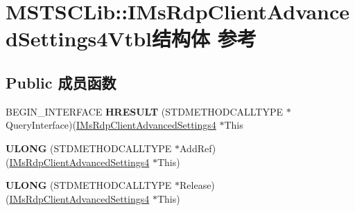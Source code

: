 \hypertarget{struct_m_s_t_s_c_lib_1_1_i_ms_rdp_client_advanced_settings4_vtbl}{}\section{M\+S\+T\+S\+C\+Lib\+:\+:I\+Ms\+Rdp\+Client\+Advanced\+Settings4\+Vtbl结构体 参考}
\label{struct_m_s_t_s_c_lib_1_1_i_ms_rdp_client_advanced_settings4_vtbl}
\subsection*{Public 成员函数}
\begin{DoxyCompactItemize}
\item 
\mbox{\label{struct_m_s_t_s_c_lib_1_1_i_ms_rdp_client_advanced_settings4_vtbl_a033a0ce0cc8e055d5d7dcf5f50311173}} 
B\+E\+G\+I\+N\+\_\+\+I\+N\+T\+E\+R\+F\+A\+CE {\bfseries H\+R\+E\+S\+U\+LT} (S\+T\+D\+M\+E\+T\+H\+O\+D\+C\+A\+L\+L\+T\+Y\+PE $\ast$Query\+Interface)(\hyperlink{interface_m_s_t_s_c_lib_1_1_i_ms_rdp_client_advanced_settings4}{I\+Ms\+Rdp\+Client\+Advanced\+Settings4} $\ast$This
\item 
\mbox{\label{struct_m_s_t_s_c_lib_1_1_i_ms_rdp_client_advanced_settings4_vtbl_ae203ed3925c552281dba85b80f01c192}} 
{\bfseries U\+L\+O\+NG} (S\+T\+D\+M\+E\+T\+H\+O\+D\+C\+A\+L\+L\+T\+Y\+PE $\ast$Add\+Ref)(\hyperlink{interface_m_s_t_s_c_lib_1_1_i_ms_rdp_client_advanced_settings4}{I\+Ms\+Rdp\+Client\+Advanced\+Settings4} $\ast$This)
\item 
\mbox{\label{struct_m_s_t_s_c_lib_1_1_i_ms_rdp_client_advanced_settings4_vtbl_a715ca5608899e624e19216fa25f6f722}} 
{\bfseries U\+L\+O\+NG} (S\+T\+D\+M\+E\+T\+H\+O\+D\+C\+A\+L\+L\+T\+Y\+PE $\ast$Release)(\hyperlink{interface_m_s_t_s_c_lib_1_1_i_ms_rdp_client_advanced_settings4}{I\+Ms\+Rdp\+Client\+Advanced\+Settings4} $\ast$This)
\item 
\mbox{\label{struct_m_s_t_s_c_lib_1_1_i_ms_rdp_client_advanced_settings4_vtbl_a47b1a110ab141b00ad04544a1bc3272b}} 

\end{DoxyCompactItemize}
